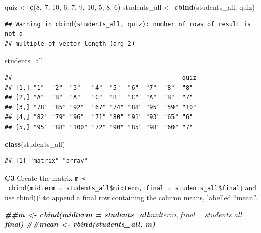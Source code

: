 \documentclass[
]{article}
\newenvironment{Shaded}{\begin{snugshade}}{\end{snugshade}}
\newcommand{\DecValTok}[1]{\textcolor[rgb]{0.00,0.00,0.81}{#1}}
\newcommand{\DocumentationTok}[1]{\textcolor[rgb]{0.56,0.35,0.01}{\textbf{\textit{#1}}}}
\newcommand{\FunctionTok}[1]{\textcolor[rgb]{0.13,0.29,0.53}{\textbf{#1}}}
\newcommand{\NormalTok}[1]{#1}
\newcommand{\OtherTok}[1]{\textcolor[rgb]{0.56,0.35,0.01}{#1}}
\begin{document}
\begin{Shaded}
\begin{Highlighting}[]
\NormalTok{quiz }\OtherTok{\textless{}{-}} \FunctionTok{c}\NormalTok{(}\DecValTok{8}\NormalTok{, }\DecValTok{7}\NormalTok{, }\DecValTok{10}\NormalTok{, }\DecValTok{6}\NormalTok{, }\DecValTok{7}\NormalTok{, }\DecValTok{9}\NormalTok{, }\DecValTok{10}\NormalTok{, }\DecValTok{5}\NormalTok{, }\DecValTok{8}\NormalTok{, }\DecValTok{6}\NormalTok{)}
\NormalTok{students\_all }\OtherTok{\textless{}{-}} \FunctionTok{cbind}\NormalTok{(students\_all, quiz)}
\end{Highlighting}
\end{Shaded}

\begin{verbatim}
## Warning in cbind(students_all, quiz): number of rows of result is not a
## multiple of vector length (arg 2)
\end{verbatim}

\begin{Shaded}
\begin{Highlighting}[]
\NormalTok{students\_all}
\end{Highlighting}
\end{Shaded}

\begin{verbatim}
##                                               quiz
## [1,] "1"  "2"  "3"   "4"  "5"  "6"  "7"  "8"  "8" 
## [2,] "A"  "B"  "A"   "C"  "B"  "C"  "A"  "B"  "7" 
## [3,] "78" "85" "92"  "67" "74" "88" "95" "59" "10"
## [4,] "82" "79" "96"  "71" "80" "91" "93" "65" "6" 
## [5,] "95" "88" "100" "72" "90" "85" "98" "60" "7"
\end{verbatim}

\begin{Shaded}
\begin{Highlighting}[]
\FunctionTok{class}\NormalTok{(students\_all)}
\end{Highlighting}
\end{Shaded}

\begin{verbatim}
## [1] "matrix" "array"
\end{verbatim}

\textbf{C3} Create the matrix
\texttt{m\ \textless{}-\ cbind(midterm\ =\ students\_all\$midterm,\ final\ =\ students\_all\$final})
and use rbind()` to append a final row containing the column means,
labelled ``mean''.

\begin{Shaded}
\begin{Highlighting}[]
\DocumentationTok{\#\#m \textless{}{-} cbind(midterm = students\_all$midterm, final = students\_all$final)}
\DocumentationTok{\#\#mean \textless{}{-} rbind(students\_all, m)}
\end{Highlighting}
\end{Shaded}
\end{document}
